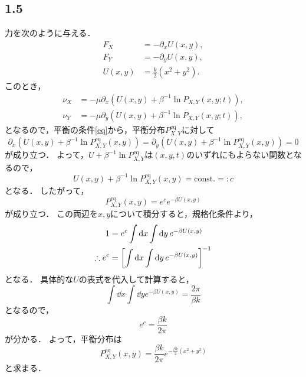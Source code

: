 \documentclass[a4paper,11pt]{jsarticle}
\begin{document}
\subsection*{1.5}
力を次のように与える．
\begin{align}
  F_X &= -\partial_x U(x,y), \\
  F_Y &= -\partial_y U(x,y), \\
  U(x,y) &= \frac{k}{2}\left(x^2+y^2\right).
\end{align}
このとき，
\begin{align}
  \nu_X &= - \mu \partial_x \left(U(x,y)+ \beta^{-1} \ln{P_{X,Y}(x,y;t)}\right),\\
  \nu_Y &= - \mu \partial_y \left(U(x,y)+ \beta^{-1} \ln{P_{X,Y}(x,y;t)}\right),
\end{align}
となるので，平衡の条件\eqref{eq}から，平衡分布$P_{X,Y}^{\mathrm{eq}}$に対して
\begin{equation}
  \partial_x \left(U(x,y)+ \beta^{-1} \ln{P_{X,Y}^{\mathrm{eq}}(x,y)}\right) = \partial_y \left(U(x,y)+ \beta^{-1} \ln{P_{X,Y}^{\mathrm{eq}}(x,y)}\right) = 0
\end{equation}
が成り立つ．
よって，$U+\beta^{-1}\ln{P_{X,Y}^{\mathrm{eq}}}$は$(x,y,t)$のいずれにもよらない関数となるので，
\begin{equation}
  U(x,y)+ \beta^{-1} \ln{P_{X,Y}^{\mathrm{eq}}(x,y)} = \mathrm{const.} =: c 
\end{equation}
となる．
したがって，
\begin{equation}
  P_{X,Y}^{\mathrm{eq}}(x,y) = e^c e^{-\beta U(x,y)}
\end{equation}
が成り立つ．
この両辺を$x,y$について積分すると，規格化条件より，
\begin{align}
  1 &= e^c \int \dd{x} \int \dd{y} e^{-\beta U(x,y)} \notag \\
  \therefore e^c &= \left[\int \dd{x} \int \dd{y} e^{-\beta U(x,y)} \right]^{-1}
\end{align}
となる．
具体的な$U$の表式を代入して計算すると，
\begin{equation}
  \int \dd{x} \int \dd{y} e^{-\beta U(x,y)} = \frac{2\pi}{\beta k}
\end{equation}
となるので，
\begin{equation}
  e^c = \frac{\beta k}{2\pi}
\end{equation}
が分かる．
よって，平衡分布は
\begin{equation}
  P_{X,Y}^{\mathrm{eq}}(x,y) = \frac{\beta k}{2\pi} e^{-\frac{\beta k}{2}\left(x^2+y^2\right)}
\end{equation}
と求まる．
\end{document}
